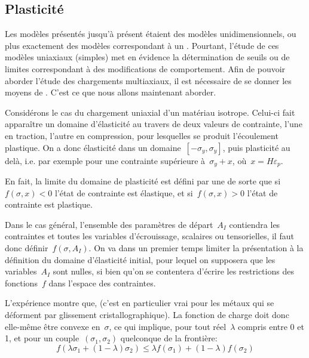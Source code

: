 \medskip
\subsection{Plasticité}

Les modèles présentés jusqu'à présent étaient des modèles unidimensionnels, ou plus exactement des modèles correspondant à un . Pourtant, l'étude de ces modèles uniaxiaux (simples) met en évidence la détermination de seuils ou de limites correspondant à des modifications de comportement. Afin de pouvoir aborder l'étude des chargements multiaxiaux, il est nécessaire de se donner les moyens de . C'est ce que nous allons maintenant aborder.

\medskip
Considérons le cas du chargement uniaxial d'un matériau isotrope. Celui-ci fait apparaître un domaine d'élasticité au travers de deux valeurs de contrainte, l'une en traction, l'autre en compression, pour lesquelles se produit l'écoulement plastique. On a donc élasticité dans un domaine~$[-\sigma_y,\sigma_y]$, puis plasticité au delà, i.e. par exemple pour une contrainte supérieure à~$\sigma_y+x$, où~$x=H\varepsilon_p$.

En fait, la limite du domaine de plasticité est défini par une  de sorte que si~$f(\sigma,x)<0$ l'état de contrainte est élastique, et si~$f(\sigma,x)>0$ l'état de contrainte est plastique.

\medskip
Dans le cas général, l'ensemble des paramètres de départ~$A_I$ contiendra les contraintes et toutes les variables d'écrouissage, scalaires ou tensorielles, il faut donc définir~$f(\sigma, A_I)$. On va dans un premier temps limiter la présentation à la définition du domaine d'élasticité initial, pour lequel on supposera que les variables~$A_I$ sont nulles, si bien qu'on se contentera d'écrire les restrictions des fonctions~$f$ dans l'espace des contraintes.

L'expérience montre que,  (c'est en particulier vrai pour les métaux qui se déforment par glissement cristallographique). La fonction de charge doit donc elle-même être convexe en~$\sigma$, ce qui implique, pour tout réel~$\lambda$ compris entre 0 et 1, et pour un couple~$(\sigma_1, \sigma_2)$ quelconque de la frontière:
\begin{equation} f (\lambda\sigma_1 + (1-\lambda)\sigma_2) \le \lambda f(\sigma_1) + (1-\lambda) f(\sigma_2) \end{equation}

